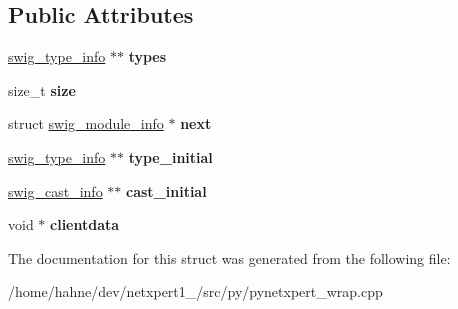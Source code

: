 \subsection*{Public Attributes}
\begin{DoxyCompactItemize}
\item 
\hyperlink{structswig__type__info}{swig\+\_\+type\+\_\+info} $\ast$$\ast$ {\bfseries types}\hypertarget{structswig__module__info_ad658c7738e9a035ef8eea865322fbf13}{}\label{structswig__module__info_ad658c7738e9a035ef8eea865322fbf13}

\item 
size\+\_\+t {\bfseries size}\hypertarget{structswig__module__info_aaf8907cf8509ee0464af8c9dfd909042}{}\label{structswig__module__info_aaf8907cf8509ee0464af8c9dfd909042}

\item 
struct \hyperlink{structswig__module__info}{swig\+\_\+module\+\_\+info} $\ast$ {\bfseries next}\hypertarget{structswig__module__info_ac177d150b85ab77122089acf1f06d9c6}{}\label{structswig__module__info_ac177d150b85ab77122089acf1f06d9c6}

\item 
\hyperlink{structswig__type__info}{swig\+\_\+type\+\_\+info} $\ast$$\ast$ {\bfseries type\+\_\+initial}\hypertarget{structswig__module__info_a76c7d5b0fc10371748616d0b6c815a17}{}\label{structswig__module__info_a76c7d5b0fc10371748616d0b6c815a17}

\item 
\hyperlink{structswig__cast__info}{swig\+\_\+cast\+\_\+info} $\ast$$\ast$ {\bfseries cast\+\_\+initial}\hypertarget{structswig__module__info_a15f6b50a41f144afb1148fc412dc01f7}{}\label{structswig__module__info_a15f6b50a41f144afb1148fc412dc01f7}

\item 
void $\ast$ {\bfseries clientdata}\hypertarget{structswig__module__info_a9fb6e461fcaf14c209049adfae4e9754}{}\label{structswig__module__info_a9fb6e461fcaf14c209049adfae4e9754}

\end{DoxyCompactItemize}


The documentation for this struct was generated from the following file\+:\begin{DoxyCompactItemize}
\item 
/home/hahne/dev/netxpert1\+\_/src/py/pynetxpert\+\_\+wrap.\+cpp\end{DoxyCompactItemize}
